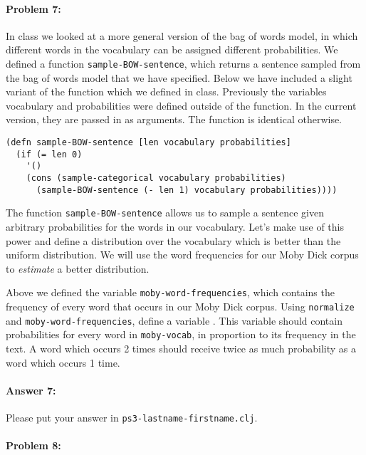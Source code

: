 \documentclass[10pt]{article}
\newcommand{\required}[1]{{\color{blue}{#1}}}
\newcommand{\PSnum}{3}
\begin{document}
\paragraph{Problem 7:}

In class we looked at a more general version of the bag of words
model, in which different words in the vocabulary can be assigned
different probabilities. We defined a function \texttt{sample-BOW-sentence},
which returns a sentence sampled from the bag of words model that we
have specified. Below we have included a slight variant of the
function which we defined in class. Previously the variables
vocabulary and probabilities were defined outside of the function. In
the current version, they are passed in as arguments. The function is
identical otherwise.

\begin{lstlisting}
(defn sample-BOW-sentence [len vocabulary probabilities]
  (if (= len 0)
    '()
    (cons (sample-categorical vocabulary probabilities)
	  (sample-BOW-sentence (- len 1) vocabulary probabilities))))
\end{lstlisting}

The function \texttt{sample-BOW-sentence} allows us to sample a
sentence given arbitrary probabilities for the words in our
vocabulary. Let's make use of this power and define a distribution
over the vocabulary which is better than the uniform distribution. We
will use the word frequencies for our Moby Dick corpus to
\emph{estimate} a better distribution.

Above we defined the variable \texttt{moby-word-frequencies}, which
contains the frequency of every word that occurs in our Moby Dick
corpus. Using \texttt{normalize} and \texttt{moby-word-frequencies},
define a variable \required{\texttt{moby-word-probabilities}}. This variable
should contain probabilities for every word in \texttt{moby-vocab}, in
proportion to its frequency in the text. A word which occurs 2 times
should receive twice as much probability as a word which occurs 1
time.

\paragraph{Answer 7:} Please put your answer in
\texttt{ps\PSnum-lastname-firstname.clj}.

\hrulefill %

\paragraph{Problem 8:}
\end{document}
